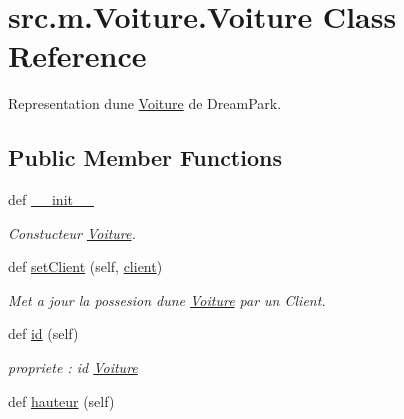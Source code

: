 \hypertarget{classsrc_1_1m_1_1_voiture_1_1_voiture}{}\section{src.\+m.\+Voiture.\+Voiture Class Reference}
\label{classsrc_1_1m_1_1_voiture_1_1_voiture}


Representation d\textquotesingle{}une \hyperlink{classsrc_1_1m_1_1_voiture_1_1_voiture}{Voiture} de Dream\+Park.  


\subsection*{Public Member Functions}
\begin{DoxyCompactItemize}
\item 
def \hyperlink{classsrc_1_1m_1_1_voiture_1_1_voiture_ab0ba53d7cbfce56990d37634a0e7ad6f}{\+\_\+\+\_\+init\+\_\+\+\_\+}
\begin{DoxyCompactList}\small\item\em Constucteur \hyperlink{classsrc_1_1m_1_1_voiture_1_1_voiture}{Voiture}. \end{DoxyCompactList}\item 
def \hyperlink{classsrc_1_1m_1_1_voiture_1_1_voiture_a183284bfabff7148a38ced93639efccf}{set\+Client} (self, \hyperlink{classsrc_1_1m_1_1_voiture_1_1_voiture_ae8d59707efd4498755760eb8f1142386}{client})
\begin{DoxyCompactList}\small\item\em Met a jour la possesion d\textquotesingle{}une \hyperlink{classsrc_1_1m_1_1_voiture_1_1_voiture}{Voiture} par un Client. \end{DoxyCompactList}\item 
\hypertarget{classsrc_1_1m_1_1_voiture_1_1_voiture_a8f51ee54004827b6feed1646feb64690}{}def \hyperlink{classsrc_1_1m_1_1_voiture_1_1_voiture_a8f51ee54004827b6feed1646feb64690}{id} (self)\label{classsrc_1_1m_1_1_voiture_1_1_voiture_a8f51ee54004827b6feed1646feb64690}

\begin{DoxyCompactList}\small\item\em propriete \+: id \hyperlink{classsrc_1_1m_1_1_voiture_1_1_voiture}{Voiture} \end{DoxyCompactList}\item 
\hypertarget{classsrc_1_1m_1_1_voiture_1_1_voiture_a1d26a15cd21da549ecd1236a6a678ab4}{}def \hyperlink{classsrc_1_1m_1_1_voiture_1_1_voiture_a1d26a15cd21da549ecd1236a6a678ab4}{hauteur} (self)\label{classsrc_1_1m_1_1_voiture_1_1_voiture_a1d26a15cd21da549ecd1236a6a678ab4}


\end{DoxyCompactItemize}
